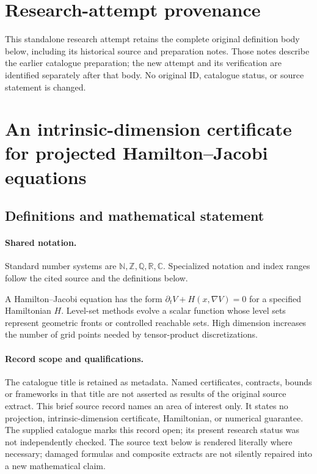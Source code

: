 \documentclass[11pt]{article}
\begin{document}
\section*{Research-attempt provenance}
This standalone research attempt retains the complete original definition body below,
including its historical source and preparation notes. Those notes describe the
earlier catalogue preparation; the new attempt and its verification are identified
separately after that body. No original ID, catalogue status, or source statement is changed.

\section{An intrinsic-dimension certificate for projected Hamilton--Jacobi equations}\label{statement}

\subsection{Definitions and mathematical statement}

\paragraph{Shared notation.}Standard number systems are $\mathbb N,\mathbb Z,\mathbb Q,\mathbb R,\mathbb C$. Specialized notation and index ranges follow the cited source and the definitions below.


A Hamilton--Jacobi equation has the form $\partial_tV+H(x,\nabla V)=0$ for a specified Hamiltonian $H$. Level-set methods evolve a scalar function whose level sets represent geometric fronts or controlled reachable sets. High dimension increases the number of grid points needed by tensor-product discretizations.
\paragraph{Record scope and qualifications.}
The catalogue title is retained as metadata. Named certificates, contracts, bounds or frameworks in that title are not asserted as results of the original source extract.
This brief source record names an area of interest only. It states no projection, intrinsic-dimension certificate, Hamiltonian, or numerical guarantee. The supplied catalogue marks this record open; its present research status was not independently checked.
The source text below is rendered literally where necessary; damaged formulas and composite extracts are not silently repaired into a new mathematical claim.
\end{document}
